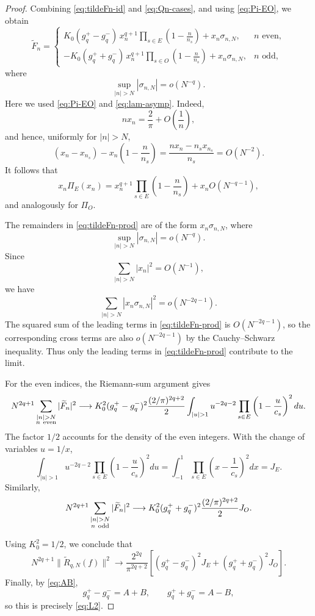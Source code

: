 \documentclass[11pt,a4paper]{article}
\theoremstyle{definition}
\begin{document}
\begin{proof}
Combining \eqref{eq:tildeFn-id} and \eqref{eq:Qn-cases}, and using
\eqref{eq:Pi-EO}, we obtain
\begin{equation}\label{eq:tildeFn-prod}
\widetilde F_n
=
\begin{cases}
\displaystyle
K_0(g_q^+-g_q^-)\,
x_n^{q+1}
\prod_{s\in E}
\left(1-\frac{n}{n_s}\right)
+x_n\sigma_{n,N},
& n\text{ even},
\\[4mm]
\displaystyle
-K_0(g_q^++g_q^-)\,
x_n^{q+1}
\prod_{s\in O}
\left(1-\frac{n}{n_s}\right)
+x_n\sigma_{n,N},
& n\text{ odd},
\end{cases}
\end{equation}
where
\[
\sup_{|n|>N}|\sigma_{n,N}|=o(N^{-q}).
\]
Here we used \eqref{eq:Pi-EO} and \eqref{eq:lam-asymp}. Indeed,
\[
nx_n=\frac{2}{\pi}+O\!\left(\frac{1}{n}\right),
\]
and hence, uniformly for $|n|>N$,
\[
(x_n-x_{n_s})
-
x_n\left(1-\frac{n}{n_s}\right)
=
\frac{nx_n-n_sx_{n_s}}{n_s}
=
O(N^{-2}).
\]
It follows that
\[
x_n\Pi_E(x_n)
=
x_n^{q+1}
\prod_{s\in E}
\left(1-\frac{n}{n_s}\right)
+
x_nO(N^{-q-1}),
\]
and analogously for $\Pi_O$.

The remainders in \eqref{eq:tildeFn-prod} are of the form
$x_n\sigma_{n,N}$, where
\[
\sup_{|n|>N}|\sigma_{n,N}|=o(N^{-q}).
\]
Since
\[
\sum_{|n|>N}|x_n|^2=O(N^{-1}),
\]
we have
\[
\sum_{|n|>N}|x_n\sigma_{n,N}|^2
=
o(N^{-2q-1}).
\]
The squared sum of the leading terms in \eqref{eq:tildeFn-prod} is
$O(N^{-2q-1})$, so the corresponding cross terms are also
$o(N^{-2q-1})$ by the Cauchy--Schwarz inequality. Thus only the
leading terms in \eqref{eq:tildeFn-prod} contribute to the limit.

For the even indices, the Riemann-sum argument gives
\[
\begin{aligned}
N^{2q+1}
\sum_{\substack{|n|>N\\ n\ {\rm even}}}
|\widetilde F_n|^2
\longrightarrow
K_0^2(g_q^+-g_q^-)^2
\frac{(2/\pi)^{2q+2}}{2}
\int_{|u|>1}
u^{-2q-2}
\prod_{s\in E}
\left(1-\frac{u}{c_s}\right)^2du.
\end{aligned}
\]
The factor $1/2$ accounts for the density of the even integers.
With the change of variables $u=1/x$,
\[
\int_{|u|>1}
u^{-2q-2}
\prod_{s\in E}
\left(1-\frac{u}{c_s}\right)^2du
=
\int_{-1}^{1}
\prod_{s\in E}
\left(x-\frac{1}{c_s}\right)^2dx
=
J_E.
\]
Similarly,
\[
N^{2q+1}
\sum_{\substack{|n|>N\\ n\ {\rm odd}}}
|\widetilde F_n|^2
\longrightarrow
K_0^2(g_q^++g_q^-)^2
\frac{(2/\pi)^{2q+2}}{2}
J_O.
\]

Using $K_0^2=1/2$, we conclude that
\[
N^{2q+1}\|\widetilde R_{q,N}(f)\|^2
\longrightarrow
\frac{2^{2q}}{\pi^{2q+2}}
\left[
(g_q^+-g_q^-)^2J_E
+
(g_q^++g_q^-)^2J_O
\right].
\]
Finally, by \eqref{eq:AB},
\[
g_q^+-g_q^-=A+B,
\qquad
g_q^++g_q^-=A-B,
\]
so this is precisely \eqref{eq:L2}.
\end{proof}
\end{document}
